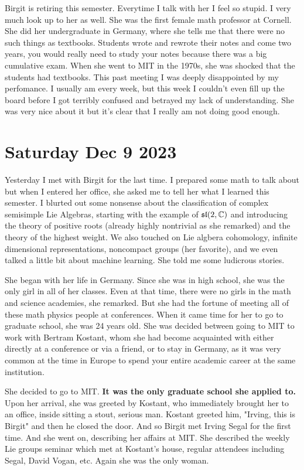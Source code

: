 \documentclass[12pt]{article}
\begin{document}
  \hfill

Birgit is retiring this semester. Everytime I talk with her I feel so stupid. I very much look up to her as well. She was the first female math professor at Cornell. She did her 
undergraduate in Germany, where she tells me that there were no such things as textbooks. Students wrote and rewrote their notes and come two years,
you would really need to study your notes because there was a big cumulative exam. When she went to MIT in the 1970s, she was shocked that the students had textbooks.
This past meeting I was deeply disappointed by my perfomance. I usually am every week, but this week I couldn't even fill up the board before I got terribly confused and betrayed 
my lack of understanding. She was very nice about it but it's clear that I really am not doing good enough.
\section{Saturday Dec 9 2023}
Yesterday I met with Birgit for the last time. I prepared some math to talk about but when I entered her office, she asked me to tell her what I learned this semester. I blurted out
some nonsense about the classification of complex semisimple Lie Algebras, starting with the example of $\mathfrak{sl}(2,\mathbb{C})$ and introducing the theory of positive roots (already highly nontrivial as she remarked)
and the theory of the highest weight. We also touched on Lie algbera cohomology, infinite dimensional representations, noncompact groups (her favorite), and we even talked 
a little bit about machine learning. She told me some ludicrous stories.

\hfill

She began with her life in Germany. Since she was in high school, she was the only girl in all of her classes. Even at that time, there were no girls in the math and science academies, she remarked.
But she had the fortune of meeting all of these math physics people at conferences. When it came time for her to go to graduate school, she was 24 years old. She was decided between going to
MIT to work with Bertram Kostant, whom she had become acquainted with either directly at a conference or via a friend, or to stay in Germany, as it was very common at the time in Europe
to spend your entire academic career at the same institution.

\hfill

She decided to go to MIT. \textbf{ It was the only graduate school she applied to.} Upon her arrival, she was greeted by Kostant, who immediately brought her to an office,
inside sitting a stout, serious man. Kostant greeted him, "Irving, this is Birgit" and then he closed the door. And so Birgit met Irving Segal for the first time. 
And she went on, describing her affairs at MIT. She described the weekly Lie groups seminar which met at Kostant's house, regular attendees including Segal, David Vogan, etc. Again she was the only woman. 
\end{document}
